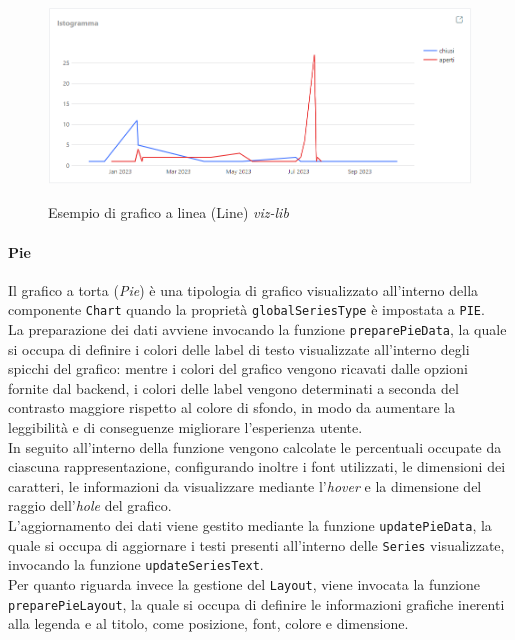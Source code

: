 \begin{figure}[H]
    \centering
    \includegraphics[alt={Esempio di grafico a linea viz-lib}, width=1 \columnwidth, height=\maxdimen, keepaspectratio]{img/ex_line.png}
    \caption{Esempio di grafico a linea (Line) \textit{viz-lib}}
    \label{fig:line-example}
\end{figure}

\paragraph{Pie}
Il grafico a torta (\textit{Pie}) è una tipologia di grafico visualizzato all'interno della componente \texttt{Chart} quando la proprietà \texttt{globalSeriesType} è impostata a \texttt{PIE}. \\
La preparazione dei dati avviene invocando la funzione \texttt{preparePieData}, la quale si occupa di definire i colori delle label di testo visualizzate all'interno degli spicchi del grafico: mentre
i colori del grafico vengono ricavati dalle opzioni fornite dal backend, i colori delle label vengono determinati a seconda del contrasto maggiore rispetto al colore di sfondo, in modo da aumentare
la leggibilità e di conseguenze migliorare l'esperienza utente. \\
In seguito all'interno della funzione vengono calcolate le percentuali occupate da ciascuna rappresentazione, configurando inoltre i font utilizzati, le dimensioni dei caratteri, le informazioni da visualizzare
mediante l'\textit{hover} e la dimensione del raggio dell'\textit{hole} del grafico. \\
L'aggiornamento dei dati viene gestito mediante la funzione \texttt{updatePieData}, la quale si occupa di aggiornare i testi presenti all'interno delle \texttt{Series} visualizzate, invocando la funzione
\texttt{updateSeriesText}. \\
Per quanto riguarda invece la gestione del \texttt{Layout}, viene invocata la funzione \texttt{preparePieLayout}, la quale si occupa di definire le informazioni grafiche inerenti alla legenda e al titolo,
come posizione, font, colore e dimensione.

